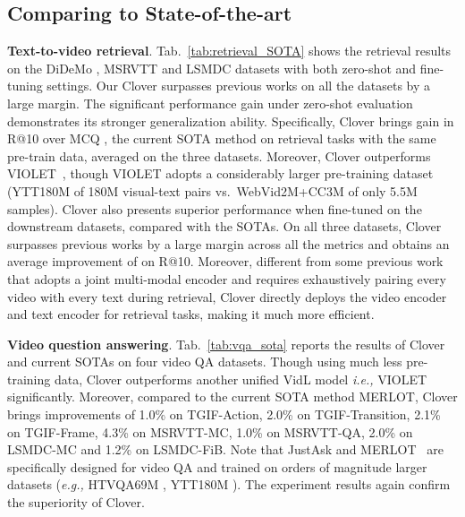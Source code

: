 \documentclass[10pt,twocolumn,letterpaper]{article}
\begin{document}
{\subsection{Comparing to State-of-the-art}
\noindent  \textbf{Text-to-video retrieval}. 
Tab.~\ref{tab:retrieval_SOTA} shows the retrieval results on the DiDeMo \cite{anne2017localizing}, MSRVTT \cite{xu2016msr} and LSMDC \cite{maharaj2017dataset} datasets with both zero-shot and fine-tuning settings. Our Clover surpasses previous works on all the datasets by a large margin. The significant performance gain under zero-shot evaluation demonstrates its stronger generalization ability. Specifically, Clover brings  gain in R@10 over MCQ \cite{ge2022bridging},  the current SOTA method on retrieval tasks with the  same pre-train data, averaged on the three datasets. Moreover, Clover outperforms VIOLET~\cite{fu2021violet}, though VIOLET adopts a considerably larger pre-training  dataset (YTT180M \cite{zellers2021merlot} of 180M visual-text pairs vs.\ WebVid2M+CC3M of only 5.5M samples).  Clover also presents superior  performance when fine-tuned on the downstream datasets, compared with the SOTAs. On all three datasets, Clover surpasses previous works by a large margin across all the metrics and obtains an average improvement of  on R@10. Moreover, different from some  previous work~\cite{lei2021less, fu2021violet, li2022alignandprompt} that adopts a joint multi-modal encoder and  requires exhaustively pairing every video with every text during retrieval, Clover directly deploys the video encoder and text encoder for retrieval tasks,  making it  much more efficient.


\noindent  \textbf{Video question answering}.
Tab.~\ref{tab:vqa_sota} reports the results of Clover and current   SOTAs on four video QA datasets. Though using much less pre-training data, Clover outperforms another unified VidL model \emph{i.e.,} VIOLET \cite{fu2021violet}  significantly. Moreover, compared to the current SOTA method MERLOT\cite{zellers2021merlot}, Clover brings  improvements of 1.0\% on TGIF-Action, 2.0\% on TGIF-Transition, 2.1\% on TGIF-Frame, 4.3\% on MSRVTT-MC, 1.0\% on MSRVTT-QA, 2.0\% on LSMDC-MC and 1.2\% on LSMDC-FiB. Note that JustAsk \cite{yang2021just} and MERLOT~\cite{zellers2021merlot} are specifically designed for video QA and trained on orders of magnitude larger datasets (\emph{e.g.,} HTVQA69M \cite{yang2021just}, YTT180M \cite{zellers2021merlot}). The experiment results again confirm the superiority of Clover.

}
\end{document}
